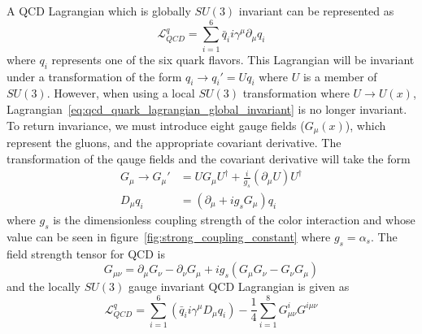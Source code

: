 A QCD Lagrangian which is globally $SU\left(3\right)$ invariant can be represented as
\begin{equation}\label{eq:qcd_quark_lagrangian_global_invariant}
	\mathcal{L}_{QCD}^{q}=\sum_{i=1}^{6}\bar{q}_{i}i\gamma^{\mu}\partial_{\mu}q_{i}
\end{equation}
where $q_{i}$ represents one of the six quark flavors.
This Lagrangian will be invariant under a transformation of the form $q_{i}{\rightarrow}q_{i}'=Uq_{i}$ where $U$ is a member of $SU\left(3\right)$.
However, when using a local $SU\left(3\right)$ transformation where $U{\rightarrow}U\left(x\right)$, Lagrangian~\ref{eq:qcd_quark_lagrangian_global_invariant} is no longer invariant.
To return invariance, we must introduce eight gauge fields ($G_{\mu}\left(x\right)$), which represent the gluons, and the appropriate covariant derivative.
The transformation of the qauge fields and the covariant derivative will take the form
\begin{align}
	G_{\mu}{\rightarrow}G_{\mu}'&=UG_{\mu}U^{\dagger}+\frac{i}{g_{s}}\left(\partial_{\mu}U\right)U^{\dagger}\\
	D_{\mu}q_{i}&=\left(\partial_{\mu}+ig_{s}G_{\mu}\right)q_{i}
\end{align}
where $g_{s}$ is the dimensionless coupling strength of the color interaction and whose value can be seen in figure~\ref{fig:strong_coupling_constant} where $g_{s}=\alpha_{s}$.
The field strength tensor for QCD is
\begin{equation}
	G_{\mu\nu}=\partial_{\mu}G_{\nu}-\partial_{\nu}G_{\mu}+ig_{s}\left(G_{\mu}G_{\nu}-G_{\nu}G_{\mu}\right)
\end{equation}
and the locally $SU\left(3\right)$ gauge invariant QCD Lagrangian is given as
\begin{equation}\label{eq:qcd_quark_lagrangian}
	\mathcal{L}_{QCD}^{q}=\sum_{i=1}^{6}\left(\bar{q}_{i}i\gamma^{\mu}D_{\mu}q_{i}\right)-\frac{1}{4}\sum_{i=1}^{8}G_{\mu\nu}^{i}G^{i\mu\nu}
\end{equation}

